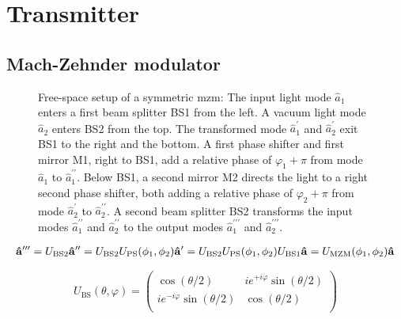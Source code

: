 \section{Transmitter}

\subsection{Mach-Zehnder modulator}

\begin{figure}[htb]
	\centering
	
	\caption{Free-space setup of a symmetric \gls{mzm}: The input light mode $\hat{a}_1$ enters a first beam splitter BS1 from the left. A vacuum light mode $\hat{a}_2$ enters BS2 from the top. The transformed mode $\hat{a}_1^\prime$ and $\hat{a}_2^\prime$ exit BS1 to the right and the bottom. A first phase shifter and first mirror M1, right to BS1, add a relative phase of $\varphi_1+\pi$ from mode $\hat{a}_1$ to $\hat{a}_1^{\prime\prime}$. Below BS1, a second mirror M2 directs the light to a right second phase shifter, both adding a relative phase of $\varphi_2+\pi$ from mode $\hat{a}_2^\prime$ to $\hat{a}_2^{\prime\prime}$. A second beam splitter BS2 transforms the input modes $\hat{a}_1^{\prime\prime}$ and $\hat{a}_2^{\prime\prime}$ to the output modes $\hat{a}_1^{\prime\prime\prime}$ and $\hat{a}_2^{\prime\prime\prime}$.}
\end{figure}

\begin{equation}
	\begin{split}
		\vb{\hat{a}}^{\prime\prime\prime}
		=
		U_\text{BS2}
		\vb{\hat{a}}^{\prime\prime}
		=
		U_\text{BS2}
		U_\text{PS}(\phi_1,\phi_2)
		\vb{\hat{a}}^{\prime}
		=
		U_\text{BS2}
		U_\text{PS}(\phi_1,\phi_2)
		U_\text{BS1}
		\vb{\hat{a}}
		=
		U_\text{MZM}(\phi_1,\phi_2)
		\vb{\hat{a}}
	\end{split}
\end{equation}

\begin{equation}
	U_\text{BS}(\theta,\varphi)
	=
	\begin{pmatrix}
		\cos(\theta/2) & ie^{+i\varphi}\sin(\theta/2) \\
		ie^{-i\varphi}\sin(\theta/2) & \cos(\theta/2) \\
	\end{pmatrix}
\end{equation}

